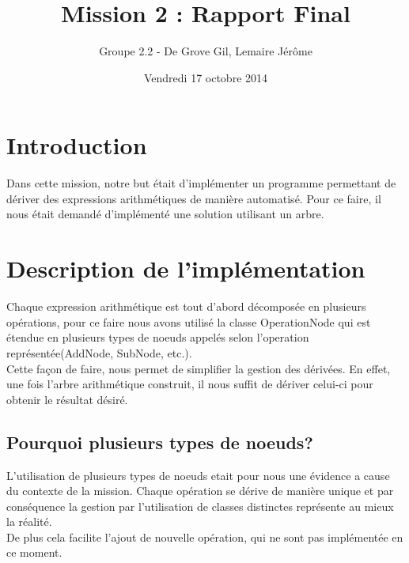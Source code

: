 \documentclass[10pt,a4paper]{article}
\date{Vendredi 17 octobre 2014}
\author{Groupe 2.2 - De Grove Gil, Lemaire Jérôme}
\title{Mission 2 : Rapport Final }
\begin{document}
\maketitle
\section*{Introduction}
Dans cette mission, notre but était d'implémenter un programme permettant de dériver des expressions arithmétiques de manière automatisé. Pour ce faire, il nous était demandé d'implémenté une solution utilisant un arbre.


\section*{Description de l'implémentation}
Chaque expression arithmétique est tout d'abord décomposée en plusieurs opérations, pour ce faire nous avons utilisé la classe OperationNode qui est étendue en plusieurs types de noeuds appelés selon l'operation représentée(AddNode, SubNode, etc.). \\ 
Cette façon de faire, nous permet de simplifier la gestion des dérivées. En effet, une fois l'arbre arithmétique construit, il nous suffit de dériver celui-ci pour obtenir le résultat désiré.

\subsection*{Pourquoi plusieurs types de noeuds?}
L'utilisation de plusieurs types de noeuds etait pour nous une évidence a cause du contexte de la mission. Chaque opération se dérive de manière unique et par conséquence la gestion par l'utilisation de classes distinctes représente au mieux la réalité.\\ De plus cela facilite l'ajout de nouvelle opération, qui ne sont pas implémentée en ce moment.
\end{document}

